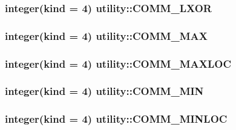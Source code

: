 \label{namespaceutility_a84fc0cdbf8b54f2cff80170d1dd375b5}
\hypertarget{namespaceutility_a8bfb05876a1579246420ebf616f24e12}{
\subsubsection[{COMM\_\-LXOR}]{\setlength{\rightskip}{0pt plus 5cm}integer(kind = 4) {\bf utility::COMM\_\-LXOR}}}
\label{namespaceutility_a8bfb05876a1579246420ebf616f24e12}
\hypertarget{namespaceutility_aa047c79aef63ff154b0eac44ec8e78c7}{
\subsubsection[{COMM\_\-MAX}]{\setlength{\rightskip}{0pt plus 5cm}integer(kind = 4) {\bf utility::COMM\_\-MAX}}}
\label{namespaceutility_aa047c79aef63ff154b0eac44ec8e78c7}
\hypertarget{namespaceutility_a64b1d9ff2637bcfc6c7a8a6a4373b45e}{
\subsubsection[{COMM\_\-MAXLOC}]{\setlength{\rightskip}{0pt plus 5cm}integer(kind = 4) {\bf utility::COMM\_\-MAXLOC}}}
\label{namespaceutility_a64b1d9ff2637bcfc6c7a8a6a4373b45e}
\hypertarget{namespaceutility_ac9e4f475384ab10881241a6d94926686}{
\subsubsection[{COMM\_\-MIN}]{\setlength{\rightskip}{0pt plus 5cm}integer(kind = 4) {\bf utility::COMM\_\-MIN}}}
\label{namespaceutility_ac9e4f475384ab10881241a6d94926686}
\hypertarget{namespaceutility_ae670c852884473e9ff57f5184c19a844}{
\subsubsection[{COMM\_\-MINLOC}]{\setlength{\rightskip}{0pt plus 5cm}integer(kind = 4) {\bf utility::COMM\_\-MINLOC}}}
\label{namespaceutility_ae670c852884473e9ff57f5184c19a844}
